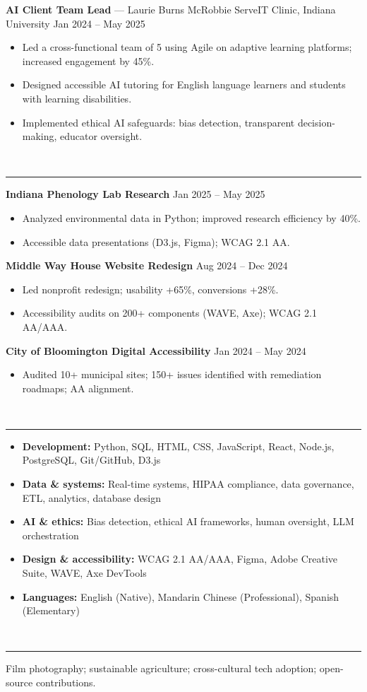 \documentclass[11pt]{article}
\newcommand{\ressection}[1]{%
  \vspace{0.55em}%
  \noindent{\large\bfseries #1}\\[-0.15em]%
  \noindent\rule{\linewidth}{0.4pt}%
  \vspace{0.3em}%
}
\begin{document}
\noindent\textbf{AI Client Team Lead} --- Laurie Burns McRobbie ServeIT Clinic, Indiana University \hfill Jan 2024 -- May 2025
\begin{itemize}
    \item Led a cross-functional team of 5 using Agile on adaptive learning platforms; increased engagement by 45\%.
    \item Designed accessible AI tutoring for English language learners and students with learning disabilities.
    \item Implemented ethical AI safeguards: bias detection, transparent decision-making, educator oversight.
\end{itemize}

\ressection{Key projects}
\noindent\textbf{Indiana Phenology Lab Research} \hfill Jan 2025 -- May 2025
\begin{itemize}
    \item Analyzed environmental data in Python; improved research efficiency by 40\%.
    \item Accessible data presentations (D3.js, Figma); WCAG 2.1 AA.
\end{itemize}

\noindent\textbf{Middle Way House Website Redesign} \hfill Aug 2024 -- Dec 2024
\begin{itemize}
    \item Led nonprofit redesign; usability +65\%, conversions +28\%.
    \item Accessibility audits on 200+ components (WAVE, Axe); WCAG 2.1 AA/AAA.
\end{itemize}

\noindent\textbf{City of Bloomington Digital Accessibility} \hfill Jan 2024 -- May 2024
\begin{itemize}
    \item Audited 10+ municipal sites; 150+ issues identified with remediation roadmaps; AA alignment.
\end{itemize}

\ressection{Skills}
\begin{itemize}
    \item \textbf{Development:} Python, SQL, HTML, CSS, JavaScript, React, Node.js, PostgreSQL, Git/GitHub, D3.js
    \item \textbf{Data \& systems:} Real-time systems, HIPAA compliance, data governance, ETL, analytics, database design
    \item \textbf{AI \& ethics:} Bias detection, ethical AI frameworks, human oversight, LLM orchestration
    \item \textbf{Design \& accessibility:} WCAG 2.1 AA/AAA, Figma, Adobe Creative Suite, WAVE, Axe DevTools
    \item \textbf{Languages:} English (Native), Mandarin Chinese (Professional), Spanish (Elementary)
\end{itemize}

\ressection{Interests}
Film photography; sustainable agriculture; cross-cultural tech adoption; open-source contributions.
\end{document}
